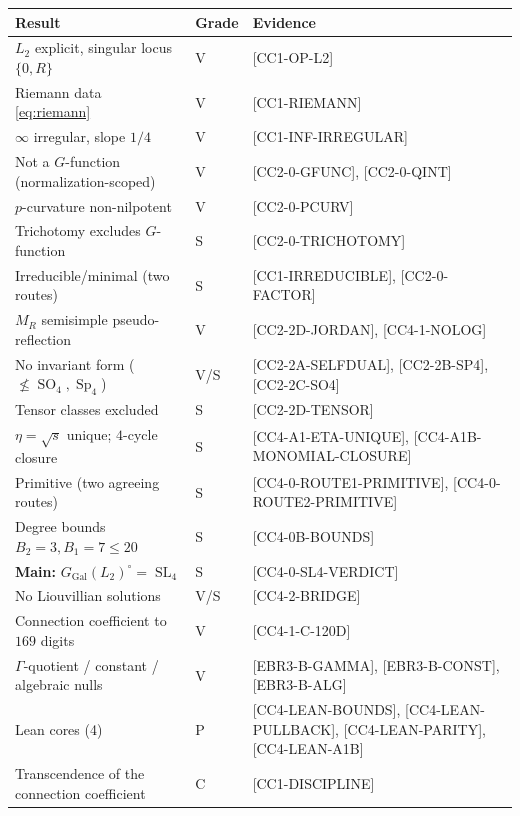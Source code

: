 \documentclass[11pt,reqno]{amsart}
\theoremstyle{plain}
\theoremstyle{definition}
\theoremstyle{remark}
\newcommand{\GGal}{G_{\mathrm{Gal}}}
\newcommand{\SL}{\operatorname{SL}}
\newcommand{\Sp}{\operatorname{Sp}}
\newcommand{\SO}{\operatorname{SO}}
\newcommand{\Ltwo}{L_{2}}
\newcommand{\claim}[1]{\textsf{\small[#1]}}
\begin{document}
\begin{center}
\small
\begin{tabular}{@{}p{}l>{\raggedright\arraybackslash}p{}@{}}
\toprule
Result & Grade & Evidence \\
\midrule
$\Ltwo$ explicit, singular locus $\{0,R\}$ & V & \claim{CC1-OP-L2} \\
Riemann data \eqref{eq:riemann} & V & \claim{CC1-RIEMANN} \\
$\infty$ irregular, slope $1/4$ & V & \claim{CC1-INF-IRREGULAR} \\
Not a $G$-function (normalization-scoped) & V & \claim{CC2-0-GFUNC},
  \claim{CC2-0-QINT} \\
$p$-curvature non-nilpotent & V & \claim{CC2-0-PCURV} \\
Trichotomy excludes $G$-function & S & \claim{CC2-0-TRICHOTOMY} \\
Irreducible/minimal (two routes) & S & \claim{CC1-IRREDUCIBLE},
  \claim{CC2-0-FACTOR} \\
$M_{R}$ semisimple pseudo-reflection & V & \claim{CC2-2D-JORDAN},
  \claim{CC4-1-NOLOG} \\
No invariant form ($\not\le\SO_{4},\Sp_{4}$) & V/S & \claim{CC2-2A-SELFDUAL},
  \claim{CC2-2B-SP4}, \claim{CC2-2C-SO4} \\
Tensor classes excluded & S & \claim{CC2-2D-TENSOR} \\
$\eta=\sqrt{s}$ unique; $4$-cycle closure & S & \claim{CC4-A1-ETA-UNIQUE},
  \claim{CC4-A1B-MONOMIAL-CLOSURE} \\
Primitive (two agreeing routes) & S & \claim{CC4-0-ROUTE1-PRIMITIVE},
  \claim{CC4-0-ROUTE2-PRIMITIVE} \\
Degree bounds $B_2{=}3,B_1{=}7\le20$ & S & \claim{CC4-0B-BOUNDS} \\
\textbf{Main:} $\GGal(\Ltwo)^{\circ}=\SL_{4}$ & S & \claim{CC4-0-SL4-VERDICT} \\
No Liouvillian solutions & V/S & \claim{CC4-2-BRIDGE} \\
Connection coefficient to $169$ digits & V & \claim{CC4-1-C-120D} \\
$\Gamma$-quotient / constant / algebraic nulls & V & \claim{EBR3-B-GAMMA},
  \claim{EBR3-B-CONST}, \claim{EBR3-B-ALG} \\
Lean cores (4) & P & \claim{CC4-LEAN-BOUNDS}, \claim{CC4-LEAN-PULLBACK},
  \claim{CC4-LEAN-PARITY}, \claim{CC4-LEAN-A1B} \\
Transcendence of the connection coefficient & C & \claim{CC1-DISCIPLINE} \\
\bottomrule
\end{tabular}
\end{center}
\end{document}
